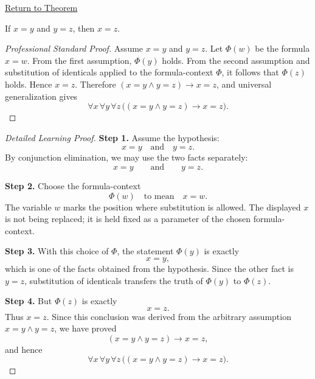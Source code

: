 \newpage
{}
\label{prf:axiomatic-equality-transitivity}

\begin{remark*}[Return]
\hyperref[thm:axiomatic-equality-transitivity]{Return to Theorem}
\end{remark*}


\begin{theorem*}
If \(x=y\) and \(y=z\), then \(x=z\).
\end{theorem*}

\begin{proof}[Professional Standard Proof]
\LRAProofBodyStart
Assume \(x=y\) and \(y=z\). Let \(\Phi(w)\) be the formula \(x=w\). From the
first assumption, \(\Phi(y)\) holds. From the second assumption and
substitution of identicals applied to the formula-context \(\Phi\), it follows
that \(\Phi(z)\) holds. Hence \(x=z\). Therefore
\((x=y\land y=z)\to x=z\), and universal generalization gives
\[
  \forall x\,\forall y\,\forall z\,\bigl((x=y\land y=z)\to x=z\bigr).
\]
\end{proof}

\begin{proof}[Detailed Learning Proof]
\LRAProofBodyStart
\textbf{Step 1.} Assume the hypothesis:
\[
  x=y \quad\text{and}\quad y=z.
\]
By conjunction elimination, we may use the two facts separately:
\[
  x=y
  \qquad\text{and}\qquad
  y=z.
\]

\textbf{Step 2.} Choose the formula-context
\[
  \Phi(w) \quad\text{to mean}\quad x=w.
\]
The variable \(w\) marks the position where substitution is allowed. The
displayed \(x\) is not being replaced; it is held fixed as a parameter of the
chosen formula-context.

\textbf{Step 3.} With this choice of \(\Phi\), the statement \(\Phi(y)\) is
exactly
\[
  x=y,
\]
which is one of the facts obtained from the hypothesis. Since the other fact is
\(y=z\), substitution of identicals transfers the truth of \(\Phi(y)\) to
\(\Phi(z)\).

\textbf{Step 4.} But \(\Phi(z)\) is exactly
\[
  x=z.
\]
Thus \(x=z\). Since this conclusion was derived from the arbitrary assumption
\(x=y\land y=z\), we have proved
\[
  (x=y\land y=z)\to x=z,
\]
and hence
\[
  \forall x\,\forall y\,\forall z\,\bigl((x=y\land y=z)\to x=z\bigr).
\]
\end{proof}


